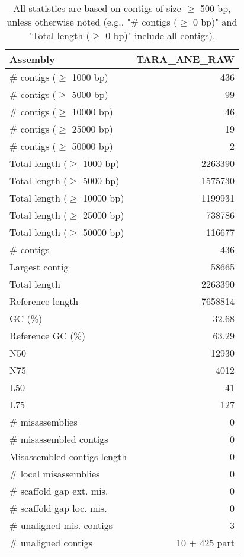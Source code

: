 \documentclass[12pt,a4paper]{article}
\begin{document}
\begin{table}[ht]
\begin{center}
\caption{All statistics are based on contigs of size $\geq$ 500 bp, unless otherwise noted (e.g., "\# contigs ($\geq$ 0 bp)" and "Total length ($\geq$ 0 bp)" include all contigs).}
\begin{tabular}{|l*{1}{|r}|}
\hline
Assembly & TARA\_ANE\_RAW \\ \hline
\# contigs ($\geq$ 1000 bp) & 436 \\ \hline
\# contigs ($\geq$ 5000 bp) & 99 \\ \hline
\# contigs ($\geq$ 10000 bp) & 46 \\ \hline
\# contigs ($\geq$ 25000 bp) & 19 \\ \hline
\# contigs ($\geq$ 50000 bp) & 2 \\ \hline
Total length ($\geq$ 1000 bp) & 2263390 \\ \hline
Total length ($\geq$ 5000 bp) & 1575730 \\ \hline
Total length ($\geq$ 10000 bp) & 1199931 \\ \hline
Total length ($\geq$ 25000 bp) & 738786 \\ \hline
Total length ($\geq$ 50000 bp) & 116677 \\ \hline
\# contigs & 436 \\ \hline
Largest contig & 58665 \\ \hline
Total length & 2263390 \\ \hline
Reference length & 7658814 \\ \hline
GC (\%) & 32.68 \\ \hline
Reference GC (\%) & 63.29 \\ \hline
N50 & 12930 \\ \hline
N75 & 4012 \\ \hline
L50 & 41 \\ \hline
L75 & 127 \\ \hline
\# misassemblies & 0 \\ \hline
\# misassembled contigs & 0 \\ \hline
Misassembled contigs length & 0 \\ \hline
\# local misassemblies & 0 \\ \hline
\# scaffold gap ext. mis. & 0 \\ \hline
\# scaffold gap loc. mis. & 0 \\ \hline
\# unaligned mis. contigs & 3 \\ \hline
\# unaligned contigs & 10 + 425 part \\ \hline

\end{tabular}
\end{center}
\end{table}
\end{document}
